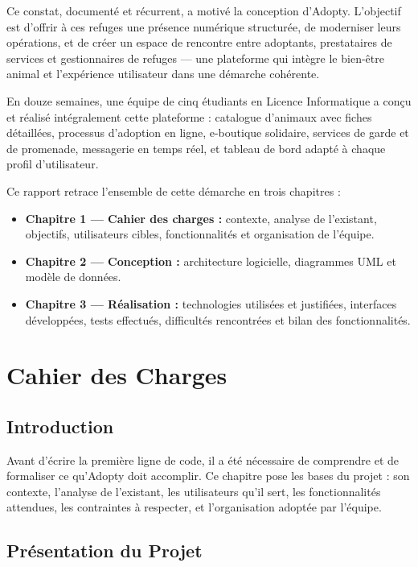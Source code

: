 \documentclass[12pt,a4paper]{report}
\begin{document}
Ce constat, documenté et récurrent, a motivé la conception d'Adopty. L'objectif est d'offrir à ces refuges une présence numérique structurée, de moderniser leurs opérations, et de créer un espace de rencontre entre adoptants, prestataires de services et gestionnaires de refuges — une plateforme qui intègre le bien-être animal et l'expérience utilisateur dans une démarche cohérente.

En douze semaines, une équipe de cinq étudiants en Licence Informatique a conçu et réalisé intégralement cette plateforme : catalogue d'animaux avec fiches détaillées, processus d'adoption en ligne, e-boutique solidaire, services de garde et de promenade, messagerie en temps réel, et tableau de bord adapté à chaque profil d'utilisateur.

Ce rapport retrace l'ensemble de cette démarche en trois chapitres :
\begin{itemize}[leftmargin=2em,itemsep=3pt]
  \item \textbf{Chapitre 1 --- Cahier des charges :} contexte, analyse de l'existant, objectifs, utilisateurs cibles, fonctionnalités et organisation de l'équipe.
  \item \textbf{Chapitre 2 --- Conception :} architecture logicielle, diagrammes UML et modèle de données.
  \item \textbf{Chapitre 3 --- Réalisation :} technologies utilisées et justifiées, interfaces développées, tests effectués, difficultés rencontrées et bilan des fonctionnalités.
\end{itemize}

\chapter{Cahier des Charges}

\section{Introduction}

Avant d'écrire la première ligne de code, il a été nécessaire de comprendre et de formaliser ce qu'Adopty doit accomplir. Ce chapitre pose les bases du projet : son contexte, l'analyse de l'existant, les utilisateurs qu'il sert, les fonctionnalités attendues, les contraintes à respecter, et l'organisation adoptée par l'équipe.

\section{Présentation du Projet}
\end{document}
